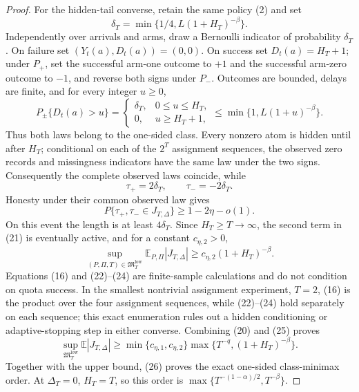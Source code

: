 \documentclass{article}
\begin{document}
\begin{proof}
For the hidden-tail converse, retain the same policy (2) and set
\[
 \delta_T=\min\{1/4,L(1+H_T)^{-\beta}\}.
 \tag{21}
\]
Independently over arrivals and arms, draw a Bernoulli indicator of probability \(\delta_T\).  On failure set \((Y_t(a),D_t(a))=(0,0)\).  On success set \(D_t(a)=H_T+1\); under \(P_+\), set the successful arm-one outcome to \(+1\) and the successful arm-zero outcome to \(-1\), and reverse both signs under \(P_-\).  Outcomes are bounded, delays are finite, and for every integer \(u\geq0\),
\[
 P_\pm\{D_t(a)>u\}
 =\begin{cases}
 \delta_T,&0\leq u\leq H_T,\\
 0,&u\geq H_T+1,
 \end{cases}
 \leq\min\{1,L(1+u)^{-\beta}\}.
 \tag{22}
\]
Thus both laws belong to the one-sided class.  Every nonzero atom is hidden until after \(H_T\); conditional on each of the \(2^T\) assignment sequences, the observed zero records and missingness indicators have the same law under the two signs.  Consequently the complete observed laws coincide, while
\[
 \tau_+=2\delta_T,
 \qquad \tau_-=-2\delta_T.
 \tag{23}
\]
Honesty under their common observed law gives
\[
 P\{\tau_+,\tau_-\in J_{T,\Delta}\}
 \geq1-2\eta-o(1).
 \tag{24}
\]
On this event the length is at least \(4\delta_T\).  Since \(H_T\geq T\to\infty\), the second term in (21) is eventually active, and for a constant \(c_{\eta,2}>0\),
\[
 \sup_{(P,\Pi,T)\in\mathfrak M_T^{\mathrm{low}}}
 \mathbb E_{P,\Pi}|J_{T,\Delta}|
 \geq c_{\eta,2}(1+H_T)^{-\beta}.
 \tag{25}
\]
Equations (16) and (22)--(24) are finite-sample calculations and do not condition on quota success.  In the smallest nontrivial assignment experiment, \(T=2\), (16) is the product over the four assignment sequences, while (22)--(24) hold separately on each sequence; this exact enumeration rules out a hidden conditioning or adaptive-stopping step in either converse.  Combining (20) and (25) proves
\[
 \sup_{\mathfrak M_T^{\mathrm{low}}}\mathbb E|J_{T,\Delta}|
 \geq\min\{c_{\eta,1},c_{\eta,2}\}
 \max\{T^{-q},(1+H_T)^{-\beta}\}.
 \tag{26}
\]
Together with the upper bound, (26) proves the exact one-sided class-minimax order.  At \(\Delta_T=0\), \(H_T=T\), so this order is \(\max\{T^{-(1-\alpha)/2},T^{-\beta}\}\).


\end{proof}
\end{document}
